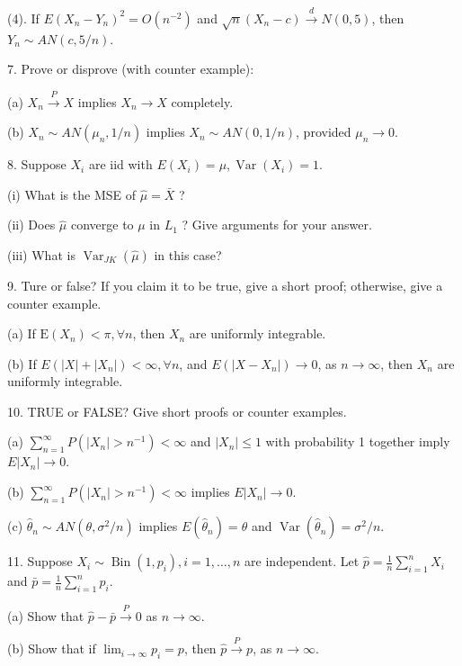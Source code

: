 \documentclass[11pt]{article}
\theoremstyle{definition}
\begin{document}
(4). If $E\left(X_n-Y_n\right)^2=O\left(n^{-2}\right)$ and $\sqrt{n}\left(X_n-c\right) \xrightarrow{d} N(0,5)$, then $Y_n \sim A N(c, 5 / n)$.

7. Prove or disprove (with counter example):

(a) $X_n \xrightarrow{P} X$ implies $X_n \rightarrow X$ completely.

(b) $X_n \sim A N\left(\mu_n, 1 / n\right)$ implies $X_n \sim A N(0,1 / n)$, provided $\mu_n \rightarrow 0$.

8. Suppose $X_i$ are iid with $E\left(X_i\right)=\mu, \operatorname{Var}\left(X_i\right)=1$.

(i) What is the MSE of $\widehat{\mu}=\bar{X}$ ?

(ii) Does $\widehat{\mu}$ converge to $\mu$ in $L_1$ ? Give arguments for your answer.

(iii) What is $\operatorname{Var}_{J K}(\widehat{\mu})$ in this case?

9. Ture or false? If you claim it to be true, give a short proof; otherwise, give a counter example.

(a) If $\mathrm{E}\left(X_n\right)<\pi, \forall n$, then $X_n$ are uniformly integrable.

(b) If $E\left(|X|+\left|X_n\right|\right)<\infty, \forall n$, and $E\left(\left|X-X_n\right|\right) \rightarrow 0$, as $n \rightarrow \infty$, then $X_n$ are uniformly integrable.

10. TRUE or FALSE? Give short proofs or counter examples.

(a) $\sum_{n=1}^{\infty} P\left(\left|X_n\right|>n^{-1}\right)<\infty$ and $\left|X_n\right| \leq 1$ with probability 1 together imply $E\left|X_n\right| \rightarrow 0$.

(b) $\sum_{n=1}^{\infty} P\left(\left|X_n\right|>n^{-1}\right)<\infty$ implies $E\left|X_n\right| \rightarrow 0$.

(c) $\hat{\theta}_n \sim A N\left(\theta, \sigma^2 / n\right)$ implies $E\left(\hat{\theta}_n\right)=\theta$ and $\operatorname{Var}\left(\hat{\theta}_n\right)=\sigma^2 / n$.

11. Suppose $X_i \sim \operatorname{Bin}\left(1, p_i\right), i=1, \ldots, n$ are independent. Let $\widehat{p}=\frac{1}{n} \sum_{i=1}^n X_i$ and $\bar{p}=\frac{1}{n} \sum_{i=1}^n p_i$.

(a) Show that $\widehat{p}-\bar{p} \xrightarrow{P} 0$ as $n \rightarrow \infty$. 

(b) Show that if $\lim _{i \rightarrow \infty} p_i=p$, then $\widehat{p} \xrightarrow{P} p$, as $n \rightarrow \infty$.
\end{document}
